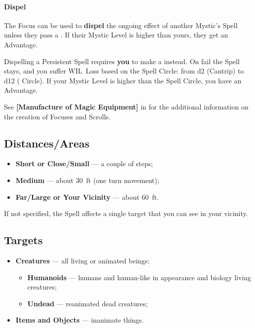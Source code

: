 \documentclass[itdr/core]{subfiles}
\begin{document}
\paragraph{Dispel}
The Focus can be used to \textbf{dispel} the ongoing effect of another Mystic's Spell unless they pass a . If their Mystic Level is higher than yours, they get an Advantage.

Dispelling a Persistent Spell requires \textbf{you} to make a  instead. On fail the Spell stays, and you suffer WIL~Loss based on the Spell Circle: from d2 (Cantrip) to d12 ( Circle). If your Mystic Level is higher than the Spell Circle, you have an Advantage.

\vspace{-0.5ex}
{\hfill
{}
\hfill}

\begin{dbox}
	See \textbf{[Manufacture of Magic Equipment]} in \mbox{\textbf{}} for the additional information on the creation of Focuses and Scrolls.
\end{dbox}

\vspace{-0.5ex}
\enlargethispage{1ex}
\break

\subsection*{Distances/Areas}
\begin{itemize}
	\item \textbf{Short or Close/Small} --- a couple of steps;
	\item \textbf{Medium} --- about 30~ft (one turn movement);
	\item \textbf{Far/Large or Your Vicinity} --- about 60~ft.
\end{itemize}
If not specified, the Spell affects a single target that you can see in your vicinity.

\subsection*{Targets}
\begin{itemize}
	\item \textbf{Creatures} --- all living or animated beings:
	\begin{itemize}
		\item \textbf{Humanoids} --- humans and human-like in appearance and biology living creatures;
		\item \textbf{Undead} --- reanimated dead creatures;
	\end{itemize}
	\item \textbf{Items and Objects} --- inanimate things.
\end{itemize}
\end{document}
